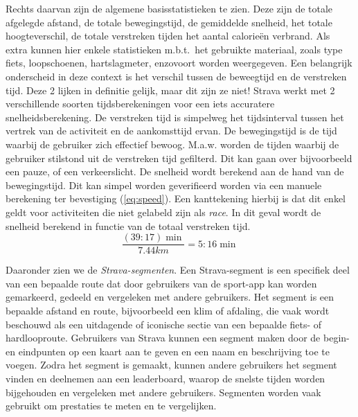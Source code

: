 Rechts daarvan zijn de algemene basisstatistieken te zien. Deze zijn de totale
afgelegde afstand, de totale bewegingstijd, de gemiddelde snelheid, het totale
hoogteverschil, de totale verstreken tijden het aantal calorieën verbrand. Als
extra kunnen hier enkele statistieken m.b.t.\ het gebruikte materiaal, zoals
type fiets, loopschoenen, hartslagmeter, enzovoort worden weergegeven. Een
belangrijk onderscheid in deze context is het verschil tussen de beweegtijd en
de verstreken tijd. Deze 2 lijken in definitie gelijk, maar dit zijn ze niet!
Strava werkt met 2 verschillende soorten tijdsberekeningen voor een iets
accuratere snelheidsberekening. De verstreken tijd is simpelweg het
tijdsinterval tussen het vertrek van de activiteit en de aankomsttijd ervan. De
bewegingstijd is de tijd waarbij de gebruiker zich effectief bewoog. M.a.w.
worden de tijden waarbij de gebruiker stilstond uit de verstreken tijd
gefilterd. Dit kan gaan over bijvoorbeeld een pauze, of een verkeerslicht. De
snelheid wordt berekend aan de hand van de bewegingstijd. Dit kan simpel worden
geverifieerd worden via een manuele berekening ter bevestiging
(\ref{eq:speed}). Een kanttekening hierbij is dat dit enkel geldt voor
activiteiten die niet gelabeld zijn als \textit{race}. In dit geval wordt de
snelheid berekend in functie van de totaal verstreken
tijd.\cite{MovingTi80:online}
\begin{equation}\label{eq:speed}
    \frac{(39:17)\min}{7.44 km} = 5:16 \min
\end{equation}

Daaronder zien we de \textit{Strava-segmenten}. Een Strava-segment is een
specifiek deel van een bepaalde route dat door gebruikers van de sport-app kan
worden gemarkeerd, gedeeld en vergeleken met andere gebruikers. Het segment is
een bepaalde afstand en route, bijvoorbeeld een klim of afdaling, die vaak
wordt beschouwd als een uitdagende of iconische sectie van een bepaalde fiets-
of hardlooproute. Gebruikers van Strava kunnen een segment maken door de begin-
en eindpunten op een kaart aan te geven en een naam en beschrijving toe te
voegen. Zodra het segment is gemaakt, kunnen andere gebruikers het segment
vinden en deelnemen aan een leaderboard, waarop de snelste tijden worden
bijgehouden en vergeleken met andere gebruikers. Segmenten worden vaak gebruikt
om prestaties te meten en te vergelijken.

